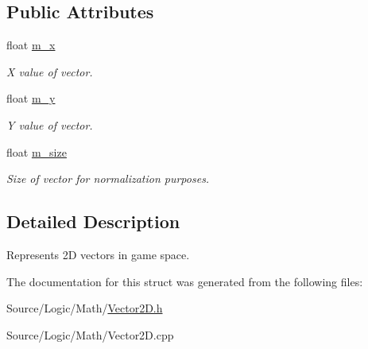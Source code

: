 \subsection*{Public Attributes}
\begin{DoxyCompactItemize}
\item 
\mbox{\label{struct_vector2_d_aeba78e197a8ba61f5728cd12710a260b}} 
float \mbox{\hyperlink{struct_vector2_d_aeba78e197a8ba61f5728cd12710a260b}{m\+\_\+x}}
\begin{DoxyCompactList}\small\item\em X value of vector. \end{DoxyCompactList}\item 
\mbox{\label{struct_vector2_d_a2dae7f715b79bbec5470161f6061d13b}} 
float \mbox{\hyperlink{struct_vector2_d_a2dae7f715b79bbec5470161f6061d13b}{m\+\_\+y}}
\begin{DoxyCompactList}\small\item\em Y value of vector. \end{DoxyCompactList}\item 
\mbox{\label{struct_vector2_d_acaa3e890f9b83f6899dad86b3848e719}} 
float \mbox{\hyperlink{struct_vector2_d_acaa3e890f9b83f6899dad86b3848e719}{m\+\_\+size}}
\begin{DoxyCompactList}\small\item\em Size of vector for normalization purposes. \end{DoxyCompactList}\end{DoxyCompactItemize}


\subsection{Detailed Description}
Represents 2D vectors in game space. 

The documentation for this struct was generated from the following files\+:\begin{DoxyCompactItemize}
\item 
Source/\+Logic/\+Math/\mbox{\hyperlink{_vector2_d_8h}{Vector2\+D.\+h}}\item 
Source/\+Logic/\+Math/Vector2\+D.\+cpp\end{DoxyCompactItemize}
